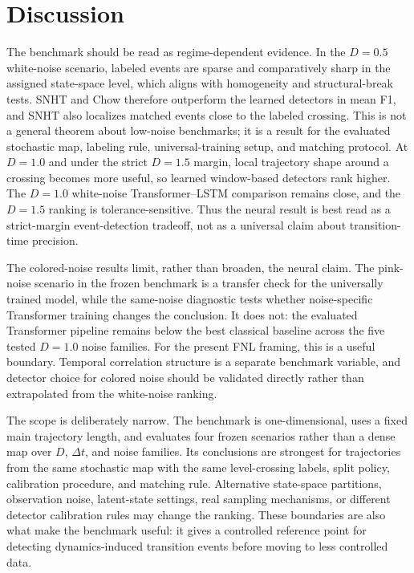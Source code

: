 \section{Discussion}

The benchmark should be read as regime-dependent evidence. In the \(D=0.5\)
white-noise scenario, labeled events are sparse and comparatively sharp in the
assigned state-space level, which aligns with homogeneity and structural-break
tests. SNHT and Chow therefore outperform the learned detectors in mean F1, and
SNHT also localizes matched events close to the labeled crossing. This is not a
general theorem about low-noise benchmarks; it is a result for the evaluated
stochastic map, labeling rule, universal-training setup, and matching protocol.
At \(D=1.0\) and under the strict \(D=1.5\) margin, local trajectory shape around
a crossing becomes more useful, so learned window-based detectors rank higher.
The \(D=1.0\) white-noise Transformer--LSTM comparison remains close, and the
\(D=1.5\) ranking is tolerance-sensitive. Thus the neural result is best read as
a strict-margin event-detection tradeoff, not as a universal claim about
transition-time precision.

The colored-noise results limit, rather than broaden, the neural claim. The
pink-noise scenario in the frozen benchmark is a transfer check for the
universally trained model, while the same-noise diagnostic tests whether
noise-specific Transformer training changes the conclusion. It does not: the
evaluated Transformer pipeline remains below the best classical baseline across
the five tested \(D=1.0\) noise families. For the present FNL framing, this is a
useful boundary. Temporal correlation structure is a separate benchmark
variable, and detector choice for colored noise should be validated directly
rather than extrapolated from the white-noise ranking.

The scope is deliberately narrow. The benchmark is one-dimensional, uses a fixed
main trajectory length, and evaluates four frozen scenarios rather than a dense
map over \(D\), \(\Delta t\), and noise families. Its conclusions are strongest
for trajectories from the same stochastic map with the same level-crossing
labels, split policy, calibration procedure, and matching rule. Alternative
state-space partitions, observation noise, latent-state settings, real sampling
mechanisms, or different detector calibration rules may change the ranking.
These boundaries are also what make the benchmark useful: it gives a controlled
reference point for detecting dynamics-induced transition events before moving
to less controlled data.

